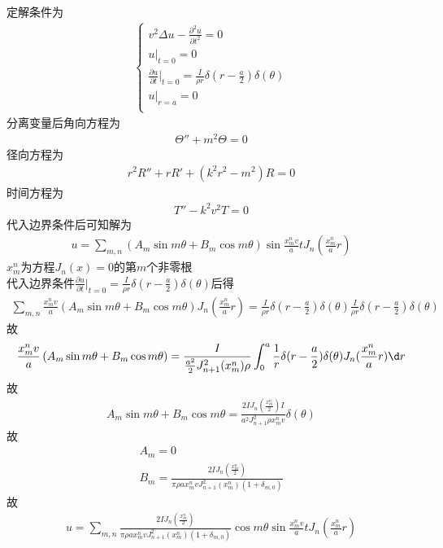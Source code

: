 \documentclass{phyasgn}
\begin{document}
\begin{sol}[3]
    定解条件为
    \begin{align*}
        \left\{
        \begin{matrix}
            v^2\Delta u-\frac{\partial^2 u}{\partial t^2}=0\\
            u|_{t=0}=0\\
            \frac{\partial u}{\partial t}|_{t=0}=\frac{I}{\rho r}\delta(r-\frac{a}{2})\delta(\theta)\\
            u|_{r=a}=0\\
        \end{matrix}
        \right.
    \end{align*}
    分离变量后角向方程为
    \begin{align*}
       \Theta''+m^2\Theta=0
    \end{align*}
    径向方程为
    \begin{align*}
        r^2R''+rR'+(k^2r^2-m^2)R=0
    \end{align*}
    时间方程为
    \begin{align*}
        T''-k^2v^2T=0
    \end{align*}
    代入边界条件后可知解为
    \begin{align}
        u=\sum_{m,n}\left(A_m\sin m\theta+B_m\cos m\theta\right)\sin\frac{x_m^nv}{a}tJ_n(\frac{x_m^n}{a}r)
    \end{align}
    $x_m^n$为方程$J_n(x)=0$的第$m$个非零根\\
    代入边界条件$\frac{\partial u}{\partial t}|_{t=0}=\frac{I}{\rho r}\delta(r-\frac{a}{2})\delta(\theta)$后得
    \begin{align*}
        \sum_{m,n}\frac{x_m^nv}{a}\left(A_m\sin m\theta+B_m\cos m\theta\right)J_n(\frac{x_m^n}{a}r)=\frac{I}{\rho r}\delta(r-\frac{a}{2})\delta(\theta)\frac{I}{\rho r}\delta(r-\frac{a}{2})\delta(\theta)
    \end{align*}
    故\begin{align*}
        \frac{x_m^nv}{a}\left(A_m\sin m\theta+B_m\cos m\theta\right)=\frac{I}{\frac{a^2}{2}J_{n+1}^2(x_m^n)\rho}\int_0^a\frac{1}{r}\delta(r-\frac{a}{2})\delta(\theta)J_n(\frac{x_m^n}{a}r)\d r
    \end{align*}
    故
    \begin{align*}
        A_m\sin m\theta+B_m\cos m\theta=\frac{2IJ_n(\frac{x_m^n}{2})I}{a^2J^2_{n+1}\rho x_m^nv}\delta(\theta)
    \end{align*}
    故
    \begin{align*}
        A_m=0\\
        B_m=\frac{2IJ_n(\frac{x_m^n}{2})}{\pi\rho ax_m^nvJ_{n+1}^2(x_m^n)(1+\delta_{m,0})}
    \end{align*}
    故
    \begin{align*}
        u=\sum_{m,n}\frac{2IJ_n(\frac{x_m^n}{2})}{\pi\rho ax_m^nvJ_{n+1}^2(x_m^n)(1+\delta_{m,0})}\cos m\theta\sin\frac{x_m^nv}{a}tJ_n(\frac{x_m^n}{a}r)
    \end{align*}
\end{sol}\par
\end{document}
